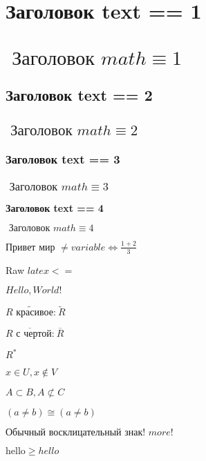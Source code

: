 \documentclass[12pt,a4paper]{scrartcl}
\def\t{\text}
\begin{document}
\section*{ Заголовок text == 1}

\section*{\(\text{ Заголовок }\allowbreak math \equiv  1\)}

\subsection*{ Заголовок text == 2}

\subsection*{\(\text{ Заголовок }\allowbreak math \equiv  2\)}

\subsubsection*{ Заголовок text == 3}

\subsubsection*{\(\text{ Заголовок }\allowbreak math \equiv  3\)}

\medskip\textbf{ Заголовок text == 4}\medskip

\medskip\textbf{\(\text{ Заголовок }\allowbreak math \equiv  4\)}\medskip

\(\text{Привет }\allowbreak \text{мир }\allowbreak \neq  variable \Leftrightarrow  \frac{1 + 2 }{ 3}\)

Raw $latex <=$


\(Hello, World!\)

\(\widetilde {R\text{ красивое:}\allowbreak }\ \widetilde R\)

\(\overline {R\text{ с }\allowbreak \text{чертой:}\allowbreak }\ \overline R\)

\(R^*\)

\(x \in U, x \not\in V\)

\(A \subset B, A \not\subset C\)

\((a \neq  b) \cong  (a \neq  b)\)

\(\text{Обычный }\allowbreak \text{восклицательный }\allowbreak \text{знак! }\allowbreak more!\)

\(\t{hello} \ge  hello\)
\end{document}
